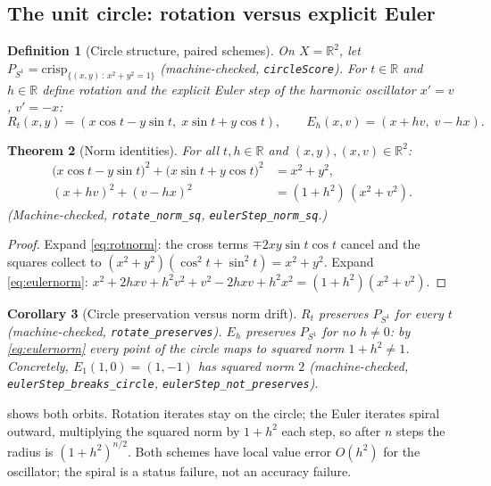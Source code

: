 \documentclass[11pt,a4paper]{article}
\newtheorem{theorem}{Theorem}[section]
\newtheorem{corollary}[theorem]{Corollary}
\newtheorem{definition}[theorem]{Definition}
\newcommand{\Real}{\mathbb{R}}
\begin{document}
\subsection{The unit circle: rotation versus explicit Euler}
\label{sec:circle}

\begin{definition}[Circle structure, paired schemes]
\label{def:circle}
On $X = \Real^2$, let
$P_{S^1} = \mathrm{crisp}_{\{(x,y) \,:\, x^2 + y^2 = 1\}}$
(machine-checked, \texttt{circleScore}).
For $t \in \Real$ and $h \in \Real$ define rotation and the explicit
Euler step of the harmonic oscillator $x' = v$, $v' = -x$:
\[
  R_t(x, y) = (x \cos t - y \sin t,\; x \sin t + y \cos t),
  \qquad
  E_h(x, v) = (x + h v,\; v - h x).
\]
\end{definition}

\begin{theorem}[Norm identities]
\label{thm:norms}
For all $t, h \in \Real$ and $(x,y), (x,v) \in \Real^2$:
\begin{align}
  \bigl(x \cos t - y \sin t\bigr)^2 + \bigl(x \sin t + y \cos t\bigr)^2
    &= x^2 + y^2,
    \label{eq:rotnorm}\\
  (x + h v)^2 + (v - h x)^2
    &= (1 + h^2)\,(x^2 + v^2).
    \label{eq:eulernorm}
\end{align}
(Machine-checked, \texttt{rotate\_norm\_sq},
\texttt{eulerStep\_norm\_sq}.)
\end{theorem}
\begin{proof}
Expand \cref{eq:rotnorm}: the cross terms
$\mp 2 x y \sin t \cos t$ cancel and the squares collect to
$(x^2 + y^2)(\cos^2 t + \sin^2 t) = x^2 + y^2$.
Expand \cref{eq:eulernorm}:
$x^2 + 2 h x v + h^2 v^2 + v^2 - 2 h x v + h^2 x^2
= (1 + h^2)(x^2 + v^2)$.
\end{proof}

\begin{corollary}[Circle preservation versus norm drift]
\label{thm:circle}
$R_t$ preserves $P_{S^1}$ for every $t$
(machine-checked, \texttt{rotate\_preserves}).
$E_h$ preserves $P_{S^1}$ for no $h \neq 0$: by
\cref{eq:eulernorm} every point of the circle maps to squared norm
$1 + h^2 \neq 1$.
Concretely, $E_1(1, 0) = (1, -1)$ has squared norm $2$
(machine-checked, \texttt{eulerStep\_breaks\_circle},
\texttt{eulerStep\_not\_preserves}).
\end{corollary}

 shows both orbits.
Rotation iterates stay on the circle; the Euler iterates spiral
outward, multiplying the squared norm by $1 + h^2$ each step, so after
$n$ steps the radius is $(1 + h^2)^{n/2}$.
Both schemes have local value error $O(h^2)$ for the oscillator; the
spiral is a status failure, not an accuracy failure.
\end{document}
